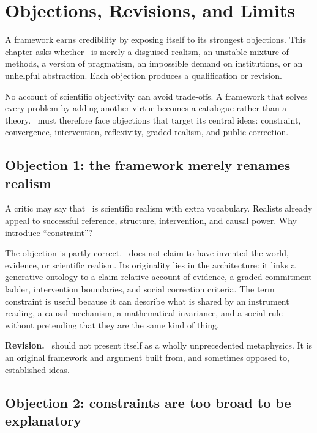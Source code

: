 \chapter{Objections, Revisions, and Limits}
\label{ch:objections}

\begin{chapterguide}
A framework earns credibility by exposing itself to its strongest objections.
This chapter asks whether \RCR\ is merely a disguised realism, an unstable
mixture of methods, a version of pragmatism, an impossible demand on
institutions, or an unhelpful abstraction. Each objection produces a
qualification or revision.
\end{chapterguide}

No account of scientific objectivity can avoid trade-offs. A framework that
solves every problem by adding another virtue becomes a catalogue rather than a
theory. \RCR\ must therefore face objections that target its central ideas:
constraint, convergence, intervention, reflexivity, graded realism, and public
correction.

\section{Objection 1: the framework merely renames realism}

A critic may say that \RCR\ is scientific realism with extra vocabulary.
Realists already appeal to successful reference, structure, intervention, and
causal power. Why introduce \enquote{constraint}?

The objection is partly correct. \RCR\ does not claim to have invented the
world, evidence, or scientific realism. Its originality lies in the
architecture: it links a generative ontology to a claim-relative account of
evidence, a graded commitment ladder, intervention boundaries, and social
correction criteria. The term constraint is useful because it can describe
what is shared by an instrument reading, a causal mechanism, a mathematical
invariance, and a social rule without pretending that they are the same kind
of thing.

\textbf{Revision.} \RCR\ should not present itself as a wholly unprecedented
metaphysics. It is an original framework and argument built from, and
sometimes opposed to, established ideas.

\section{Objection 2: constraints are too broad to be explanatory}


